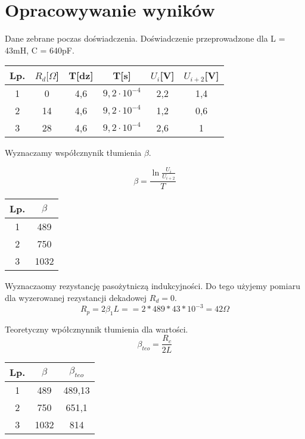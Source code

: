 \documentclass[11pt]{article}
\author{Łukasz Dubiel}
\begin{document}
\section{Opracowywanie wyników}

Dane zebrane poczas doświadczenia. Doświadczenie przeprowadzone dla L = 43mH, C = 640pF.
\begin{center}
\begin{tabular}{|c|c|c|c|c|c|}
\hline
	Lp. & $R_d [\Omega$] & T[dz] & T[s] & $U_i$[V] & $U_{i+2}$[V] \\
\hline
	1 & 0 & 4,6 & $9,2 \cdot 10^{-4}$
	 & 2,2 & 1,4 \\
	 
	2 & 14 & 4,6 & $9,2 \cdot 10^{-4}$
	 & 1,2 & 0,6 \\
	 
	3 & 28 & 4,6 & $9,2 \cdot 10^{-4}$
	 & 2,6 & 1 \\
\hline
\end{tabular}
\end{center}
Wyznaczamy współcznynik tłumienia $\beta$.
\begin{multicols}{2}
$$ \beta = \frac{ \ln{\frac{U_i}{U_{i+2}}}}{T} $$
\begin{center}
\begin{tabular}{|c|c|}
\hline
Lp. & $\beta$  \\  
\hline
1 & 489 \\
2 & 750 \\
3 & 1032 \\
\hline
\end{tabular}
\end{center}
\end{multicols}
Wyznaczaomy rezystancję pasożytniczą indukcyjności.
Do tego użyjemy pomiaru dla wyzerowanej rezystancji dekadowej $R_d = 0$.
$$ R_p = 2 \beta_1 L == 2 *489 * 43 * 10^{-3} = 42 \Omega $$
\begin{multicols}{2}
Teoretyczny wpółcznynnik tłumienia dla wartości.
$$ \beta_{teo} = \frac{R_c}{2L}  $$
\begin{center}
\begin{tabular}{|c|c|c|}
\hline
Lp. & $\beta$ & $\beta_{teo}$  \\  
\hline
1 & 489 & 489,13\\
2 & 750 & 651,1\\
3 & 1032 & 814 \\
\hline
\end{tabular}
\end{center}
\end{multicols}
\end{document}
